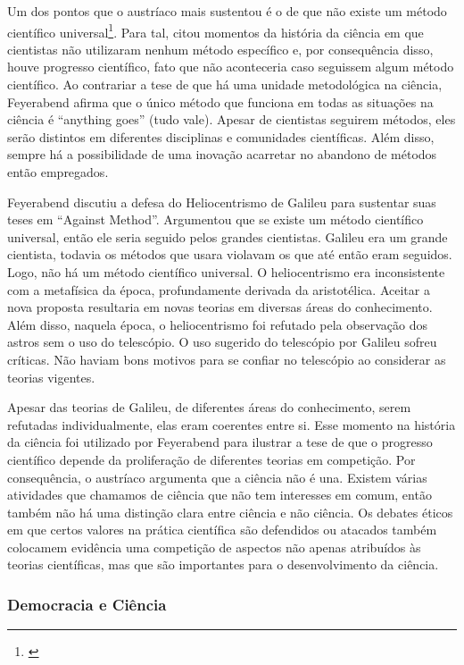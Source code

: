 \documentclass[12pt]{report}
\begin{document}
			Um dos pontos que o austríaco mais sustentou é o de que não existe um método científico universal\footnote{\cite{feyerabend-against-method}}.
			Para tal, citou momentos da história da ciência em que cientistas não utilizaram nenhum método específico e, por consequência disso, houve progresso científico, fato que não aconteceria caso seguissem algum método científico.
			Ao contrariar a tese de que há uma unidade metodológica na ciência, Feyerabend afirma que o único método que funciona em todas as situações na ciência é ``anything goes'' (tudo vale).
			Apesar de cientistas seguirem métodos, eles serão distintos em diferentes disciplinas e comunidades científicas.
			Além disso, sempre há a possibilidade de uma inovação acarretar no abandono de métodos então empregados.
			
			Feyerabend discutiu a defesa do Heliocentrismo de Galileu para sustentar suas teses em ``Against Method''.
			Argumentou que se existe um método científico universal, então ele seria seguido pelos grandes cientistas.
			Galileu era um grande cientista, todavia os métodos que usara violavam os que até então eram seguidos.
			Logo, não há um método científico universal.
			O heliocentrismo era inconsistente com a metafísica da época, profundamente derivada da aristotélica.
			Aceitar a nova proposta resultaria em novas teorias em diversas áreas do conhecimento.
			Além disso, naquela época, o heliocentrismo foi refutado pela observação dos astros sem o uso do telescópio.
			O uso sugerido do telescópio por Galileu sofreu críticas.
			Não haviam bons motivos para se confiar no telescópio ao considerar as teorias vigentes.
			
			Apesar das teorias de Galileu, de diferentes áreas do conhecimento, serem refutadas individualmente, elas eram coerentes entre si.
			Esse momento na história da ciência foi utilizado por Feyerabend para ilustrar a tese de que o progresso científico depende da proliferação de diferentes teorias em competição.
			Por consequência, o austríaco argumenta que a ciência não é una.
			Existem várias atividades que chamamos de ciência que não tem interesses em comum, então também não há uma distinção clara entre ciência e não ciência.
			Os debates éticos em que certos valores na prática científica são defendidos ou atacados também colocamem evidência uma competição de aspectos não apenas atribuídos às teorias científicas, mas que são importantes para o desenvolvimento da ciência.
			
		\subsubsection{Democracia e Ciência}
		
\end{document}
